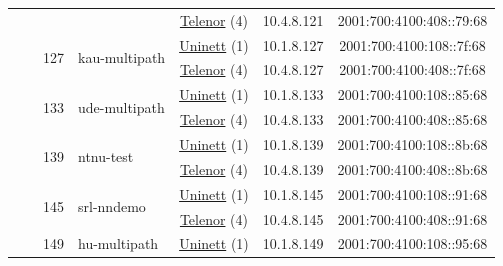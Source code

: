 \begin{small}
\begin{center}
\begin{longtable}{|c|c|c|c|c|c|c|c|}
  &  &  &  & \multicolumn{2}{|c|}{\tiny{\href{https://www.telenor.no}{Telenor} (4)}} & \tiny{10.4.8.121} & \tiny{2001:700:4100:408::79:68} \\* \cline{3-3}\cline{4-4}\cline{5-5}\cline{6-6}\cline{7-7}\cline{8-8}
  &  & \multirow{2}{*}{\tiny{127}} & \multicolumn{1}{|l|}{\multirow{2}{*}{\tiny{kau-multipath}}} & \multicolumn{2}{|c|}{\tiny{\href{https://www.uninett.no}{Uninett} (1)}} & \tiny{10.1.8.127} & \tiny{2001:700:4100:108::7f:68} \\* \cline{5-5}\cline{6-6}\cline{7-7}\cline{8-8}
  &  &  &  & \multicolumn{2}{|c|}{\tiny{\href{https://www.telenor.no}{Telenor} (4)}} & \tiny{10.4.8.127} & \tiny{2001:700:4100:408::7f:68} \\* \cline{3-3}\cline{4-4}\cline{5-5}\cline{6-6}\cline{7-7}\cline{8-8}
  &  & \multirow{2}{*}{\tiny{133}} & \multicolumn{1}{|l|}{\multirow{2}{*}{\tiny{ude-multipath}}} & \multicolumn{2}{|c|}{\tiny{\href{https://www.uninett.no}{Uninett} (1)}} & \tiny{10.1.8.133} & \tiny{2001:700:4100:108::85:68} \\* \cline{5-5}\cline{6-6}\cline{7-7}\cline{8-8}
  &  &  &  & \multicolumn{2}{|c|}{\tiny{\href{https://www.telenor.no}{Telenor} (4)}} & \tiny{10.4.8.133} & \tiny{2001:700:4100:408::85:68} \\* \cline{3-3}\cline{4-4}\cline{5-5}\cline{6-6}\cline{7-7}\cline{8-8}
  &  & \multirow{2}{*}{\tiny{139}} & \multicolumn{1}{|l|}{\multirow{2}{*}{\tiny{ntnu-test}}} & \multicolumn{2}{|c|}{\tiny{\href{https://www.uninett.no}{Uninett} (1)}} & \tiny{10.1.8.139} & \tiny{2001:700:4100:108::8b:68} \\* \cline{5-5}\cline{6-6}\cline{7-7}\cline{8-8}
  &  &  &  & \multicolumn{2}{|c|}{\tiny{\href{https://www.telenor.no}{Telenor} (4)}} & \tiny{10.4.8.139} & \tiny{2001:700:4100:408::8b:68} \\* \cline{3-3}\cline{4-4}\cline{5-5}\cline{6-6}\cline{7-7}\cline{8-8}
  &  & \multirow{2}{*}{\tiny{145}} & \multicolumn{1}{|l|}{\multirow{2}{*}{\tiny{srl-nndemo}}} & \multicolumn{2}{|c|}{\tiny{\href{https://www.uninett.no}{Uninett} (1)}} & \tiny{10.1.8.145} & \tiny{2001:700:4100:108::91:68} \\* \cline{5-5}\cline{6-6}\cline{7-7}\cline{8-8}
  &  &  &  & \multicolumn{2}{|c|}{\tiny{\href{https://www.telenor.no}{Telenor} (4)}} & \tiny{10.4.8.145} & \tiny{2001:700:4100:408::91:68} \\* \cline{3-3}\cline{4-4}\cline{5-5}\cline{6-6}\cline{7-7}\cline{8-8}
  &  & \multirow{2}{*}{\tiny{149}} & \multicolumn{1}{|l|}{\multirow{2}{*}{\tiny{hu-multipath}}} & \multicolumn{2}{|c|}{\tiny{\href{https://www.uninett.no}{Uninett} (1)}} & \tiny{10.1.8.149} & \tiny{2001:700:4100:108::95:68} \\* \cline{5-5}\cline{6-6}\cline{7-7}\cline{8-8}

\end{longtable}
\end{center}
\end{small}
